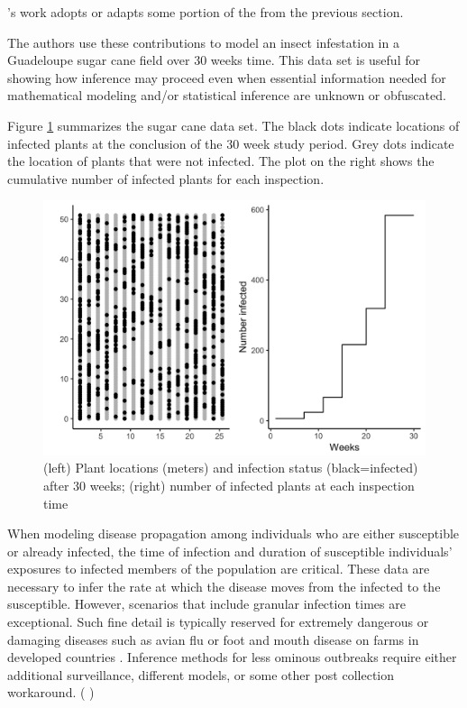 \documentclass{uwstat572}
\newcommand{\vmcomment}[1]{({\color{blue}{VM's comment:}} \textbf{\color{blue}{#1}})}
\begin{document}
\citet{Brown}'s work adopts or adapts some portion of the from the previous section.

The authors use these contributions to model an insect infestation in a Guadeloupe sugar cane field over 30 weeks time. 
This data set is useful for showing how inference may proceed even when essential information needed for mathematical modeling and/or statistical inference are unknown or obfuscated. 

Figure \ref{fig:data_plot} summarizes the sugar cane data set. 
The black dots indicate locations of infected plants at the conclusion of the 30 week study period. 
Grey dots indicate the location of plants that were not infected. 
The plot on the right shows the cumulative number of infected plants for each inspection.

\begin{figure}[H]
\centering
\includegraphics[height=0.5\linewidth, keepaspectratio]{figures/figure_1.png}
\caption{(left) Plant locations (meters) and infection status (black=infected) after 30 weeks; (right) number of infected plants at each inspection time}
\label{fig:data_plot}
\end{figure} 

When modeling disease propagation among individuals who are either susceptible or already infected, the time of infection and duration of susceptible individuals' exposures to infected members of the population are critical. 
These data are necessary to infer the rate at which the disease moves from the infected to the susceptible. 
However, scenarios that include granular infection times are exceptional. 
Such fine detail is typically reserved for extremely dangerous or damaging diseases such as avian flu or foot and mouth disease on farms in developed countries \citep{McKinley}. 
Inference methods for less ominous outbreaks require either additional surveillance, different models, or some other post collection workaround. 
\vmcomment{Actually, I don't know of any infectious disease surveillance program that can collect exact infection times.}
\end{document}
